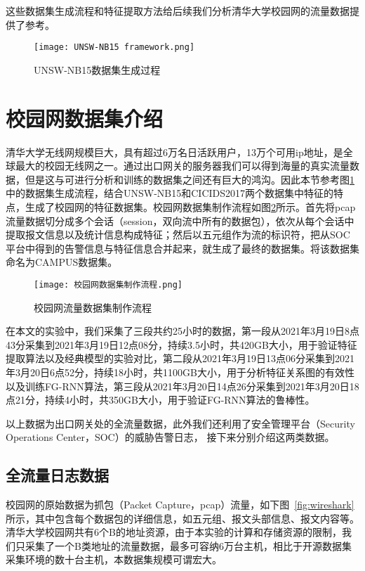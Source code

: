 这些数据集生成流程和特征提取方法给后续我们分析清华大学校园网的流量数据提供了参考。


\begin{figure}
    \centering
    \texttt{[image: UNSW-NB15 framework.png]}
    \caption{UNSW-NB15数据集生成过程}
    \label{fig:UNSW-NB15数据集生成过程}
  \end{figure}


\section{校园网数据集介绍}
清华大学无线网规模巨大，具有超过6万名日活跃用户，13万个可用ip地址，是全球最大的校园无线网之一。通过出口网关的服务器我们可以得到海量的真实流量数据，但是这与可进行分析和训练的数据集之间还有巨大的鸿沟。因此本节参考图\ref{fig:UNSW-NB15数据集生成过程}中的数据集生成流程，结合UNSW-NB15和CICIDS2017两个数据集中特征的特点，生成了校园网的特征数据集。校园网数据集制作流程如图\ref{fig:流量数据集制作流程}所示。首先将pcap流量数据切分成多个会话（session，双向流中所有的数据包），依次从每个会话中提取报文信息以及统计信息构成特征；然后以五元组作为流的标识符，把从SOC平台中得到的告警信息与特征信息合并起来，就生成了最终的数据集。将该数据集命名为CAMPUS数据集。
\begin{figure}
    \centering
    \texttt{[image: 校园网数据集制作流程.png]}

    \caption{校园网流量数据集制作流程}
    \label{fig:流量数据集制作流程}
  \end{figure}

在本文的实验中，我们采集了三段共约25小时的数据，第一段从2021年3月19日8点43分采集到2021年3月19日12点08分，持续3.5小时，共420GB大小，用于验证特征提取算法以及经典模型的实验对比，第二段从2021年3月19日13点06分采集到2021年3月20日6点52分，持续18小时，共1100GB大小，用于分析特征关系图的有效性以及训练FG-RNN算法，第三段从2021年3月20日14点26分采集到2021年3月20日18点21分，持续4小时，共350GB大小，用于验证FG-RNN算法的鲁棒性。

以上数据为出口网关处的全流量数据，此外我们还利用了安全管理平台（Security Operations Center，SOC）的威胁告警日志，
接下来分别介绍这两类数据。

\subsection{全流量日志数据}
校园网的原始数据为抓包（Packet Capture，pcap）流量，如下图~\ref{fig:wireshark}所示，其中包含每个数据包的详细信息，如五元组、报文头部信息、报文内容等。清华大学校园网共有6个B的地址资源，由于本实验的计算和存储资源的限制，我们只采集了一个B类地址的流量数据，最多可容纳6万台主机，相比于开源数据集采集环境的数十台主机，本数据集规模可谓宏大。


